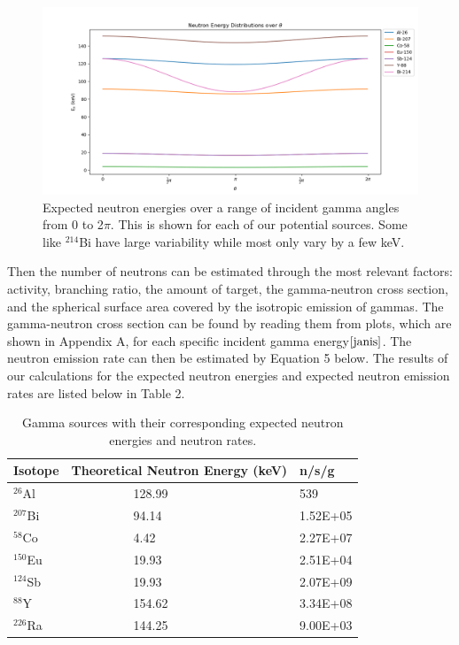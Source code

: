 \documentclass[%
12pt,
twoside,
reprint,
amsmath,amssymb,
aps,
]{article}
\begin{document}
	\begin{figure}[t]
		\includegraphics[scale = 0.7, center]{Images/neutron_energy_distribution.png}
		\caption{\label{tab:table-name} Expected neutron energies over a range of incident gamma angles from 0 to 2$\pi$. This is shown for each of our potential sources. Some like $^{214}$Bi have large variability while most only vary by a few keV.}
	\end{figure}
	
	\noindent Then the number of neutrons can be estimated through the most relevant factors: activity, branching ratio, the amount of target, the gamma-neutron cross section, and the spherical surface area covered by the isotropic emission of gammas. The gamma-neutron cross section can be found by reading them from plots, which are shown in Appendix A, for each specific incident gamma energy$\cite{janis}$. The neutron emission rate can then be estimated by Equation 5 below. The results of our calculations for the expected neutron energies and expected neutron emission rates are listed below in Table 2.
	
	\begin{table}
		\begin{center}
			\scriptsize
			\begin{tabular}{p{3.1cm} p{3.1cm} p{3.1cm}}
				\hline
				\textbf{Isotope} & \textbf{Theoretical Neutron Energy (keV)} & \textbf{n/s/g} \\ \hline
				$^{26}$Al &\ \ \ \ \ \ \ \ \ \ 128.99 & 539 \\ \hline
				$^{207}$Bi &\ \ \ \ \ \ \ \ \ \ 94.14 & 1.52E+05 \\ \hline
				$^{58}$Co &\ \ \ \ \ \ \ \ \ \ 4.42 & 2.27E+07 \\ \hline
				$^{150}$Eu &\ \ \ \ \ \ \ \ \ \ 19.93 & 2.51E+04 \\ \hline
				$^{124}$Sb &\ \ \ \ \ \ \ \ \ \ 19.93 & 2.07E+09 \\ \hline
				$^{88}$Y &\ \ \ \ \ \ \ \ \ \ 154.62 & 3.34E+08 \\ \hline
				$^{226}$Ra &\ \ \ \ \ \ \ \ \ \ 144.25 & 9.00E+03 \\ \hline
			\end{tabular}
			\caption{Gamma sources with their corresponding expected neutron energies and neutron rates.}
		\end{center}
	\end{table}
	
\end{document}
